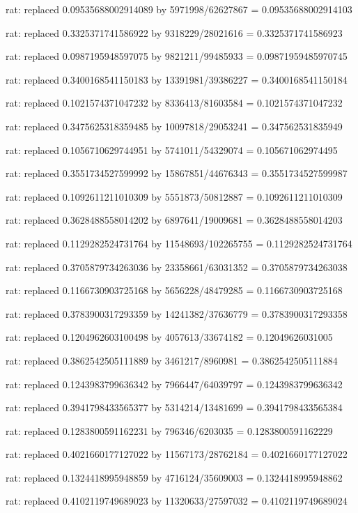 \documentclass[a4paper,10pt]{article}
\begin{document}
\begin{eulernotebook}
\begin{eulercomment}
\begin{eulercomment}
\begin{eulercomment}
\begin{eulercomment}
\begin{eulercomment}
\begin{eulercomment}
\begin{eulercomment}
\begin{eulercomment}
\begin{eulercomment}
\begin{eulercomment}
\begin{eulercomment}
\begin{eulercomment}
\begin{eulercomment}
\begin{eulercomment}
\begin{eulercomment}
\begin{eulercomment}
\begin{euleroutput}
  rat: replaced 0.09535688002914089 by 5971998/62627867 = 0.09535688002914103
  
  rat: replaced 0.3325371741586922 by 9318229/28021616 = 0.3325371741586923
  
  rat: replaced 0.0987195948597075 by 9821211/99485933 = 0.09871959485970745
  
  rat: replaced 0.3400168541150183 by 13391981/39386227 = 0.3400168541150184
  
  rat: replaced 0.1021574371047232 by 8336413/81603584 = 0.1021574371047232
  
  rat: replaced 0.3475625318359485 by 10097818/29053241 = 0.347562531835949
  
  rat: replaced 0.1056710629744951 by 5741011/54329074 = 0.105671062974495
  
  rat: replaced 0.3551734527599992 by 15867851/44676343 = 0.3551734527599987
  
  rat: replaced 0.1092611211010309 by 5551873/50812887 = 0.1092611211010309
  
  rat: replaced 0.3628488558014202 by 6897641/19009681 = 0.3628488558014203
  
  rat: replaced 0.1129282524731764 by 11548693/102265755 = 0.1129282524731764
  
  rat: replaced 0.3705879734263036 by 23358661/63031352 = 0.3705879734263038
  
  rat: replaced 0.1166730903725168 by 5656228/48479285 = 0.1166730903725168
  
  rat: replaced 0.3783900317293359 by 14241382/37636779 = 0.3783900317293358
  
  rat: replaced 0.1204962603100498 by 4057613/33674182 = 0.12049626031005
  
  rat: replaced 0.3862542505111889 by 3461217/8960981 = 0.3862542505111884
  
  rat: replaced 0.1243983799636342 by 7966447/64039797 = 0.1243983799636342
  
  rat: replaced 0.3941798433565377 by 5314214/13481699 = 0.3941798433565384
  
  rat: replaced 0.1283800591162231 by 796346/6203035 = 0.1283800591162229
  
  rat: replaced 0.4021660177127022 by 11567173/28762184 = 0.4021660177127022
  
  rat: replaced 0.1324418995948859 by 4716124/35609003 = 0.1324418995948862
  
  rat: replaced 0.4102119749689023 by 11320633/27597032 = 0.4102119749689024
  

\end{euleroutput}
\end{eulercomment}
\end{eulercomment}
\end{eulercomment}
\end{eulercomment}
\end{eulercomment}
\end{eulercomment}
\end{eulercomment}
\end{eulercomment}
\end{eulercomment}
\end{eulercomment}
\end{eulercomment}
\end{eulercomment}
\end{eulercomment}
\end{eulercomment}
\end{eulercomment}
\end{eulercomment}
\end{eulernotebook}
\end{document}
